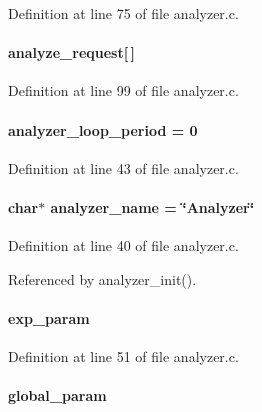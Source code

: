 Definition at line 75 of file analyzer.c.
\paragraph[{analyze\_\-request}]{ {\bf analyze\_\-request}\mbox{[}$\,$\mbox{]}}\hfill\label{analyzer_8c_ab1be3d7f64edcbf386bfd220bc7bda9b}


Definition at line 99 of file analyzer.c.
\paragraph[{analyzer\_\-loop\_\-period}]{ {\bf analyzer\_\-loop\_\-period} = 0}\hfill\label{analyzer_8c_a8fd380b49c2d273b54ec6a6fb077d760}


Definition at line 43 of file analyzer.c.
\paragraph[{analyzer\_\-name}]{\setlength{\rightskip}{0pt plus 5cm}char$\ast$ {\bf analyzer\_\-name} = \char`\"{}Analyzer\char`\"{}}\hfill\label{analyzer_8c_ac0643332f28f071aea7b0bd6c8d49a0c}


Definition at line 40 of file analyzer.c.

Referenced by analyzer\_\-init().
\paragraph[{exp\_\-param}]{ {\bf exp\_\-param}}\hfill\label{analyzer_8c_a6f1a7395cc240fde69229adefec8127f}


Definition at line 51 of file analyzer.c.
\paragraph[{global\_\-param}]{ {\bf global\_\-param}}\hfill\label{analyzer_8c_a458ba14b3bed4beeb1e079a0e0aa8eca}


